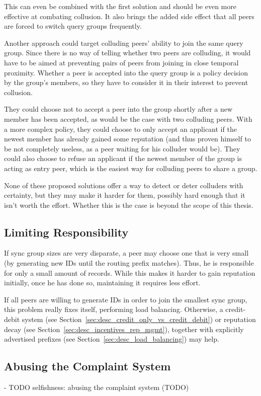 This can even be combined with the first solution and should be even more
effective at combating collusion. It also brings the added side effect that all
peers are forced to switch query groups frequently.

Another approach could target colluding peers' ability to join the same query
group. Since there is no way of telling whether two peers are colluding, it
would have to be aimed at preventing pairs of peers from joining in close
temporal proximity. Whether a peer is accepted into the query group is a policy
decision by the group's members, so they have to consider it in their interest
to prevent collusion.

They could choose not to accept a peer into the group shortly after a new member
has been accepted, as would be the case with two colluding peers. With a more
complex policy, they could choose to only accept an applicant if the newest
member has already gained some reputation (and thus proven himself to be not
completely useless, as a peer waiting for his colluder would be). They could
also choose to refuse an applicant if the newest member of the group is acting
as entry peer, which is the easiest way for colluding peers to share a group.

None of these proposed solutions offer a way to detect or deter colluders with
certainty, but they may make it harder for them, possibly hard enough that it
isn't worth the effort. Whether this is the case is beyond the scope of this
thesis.

\subsection{Limiting Responsibility}
If sync group sizes are very disparate, a peer may choose one that is very small
(by generating new IDs until the routing prefix matches). Thus, he is
responsible for only a small amount of records. While this makes it harder to
gain reputation initially, once he has done so, maintaining it requires less
effort.

If all peers are willing to generate IDs in order to join the smallest sync
group, this problem really fixes itself, performing load balancing. Otherwise, a
credit-debit system (see Section~\ref{sec:desc_credit_only_vs_credit_debit}) or
reputation decay (see Section~\ref{sec:desc_incentives_rep_mgmt}), together with
explicitly advertised prefixes (see Section~\ref{sec:desc_load_balancing}) may
help.

\subsection{Abusing the Complaint System}
- TODO selfishness: abusing the complaint system (TODO)

